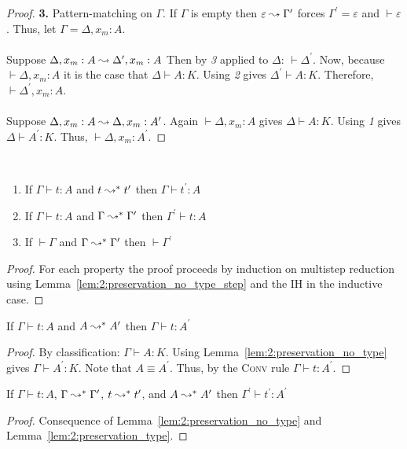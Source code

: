 \begin{proof}
    \noindent \textbf{3.} Pattern-matching on $\Gamma$.
    If $\Gamma$ is empty then $\varepsilon \leadsto \Gamma^\prime$ forces $\Gamma^\prime = \varepsilon$ and $\vdash \varepsilon$.
    Thus, let $\Gamma = \Delta, x_m : A$.
    \\ \\
    Suppose $\Delta, x_m : A \leadsto \Delta^\prime, x_m : A$
    Then by \textit{3} applied to $\Delta$: $\vdash \Delta^\prime$.
    Now, because $\vdash \Delta, x_m : A$ it is the case that $\Delta \vdash A : K$.
    Using \textit{2} gives $\Delta^\prime \vdash A : K$.
    Therefore, $\vdash \Delta^\prime, x_m : A$.
    \\ \\
    Suppose $\Delta, x_m : A \leadsto \Delta, x_m : A^\prime$.
    Again $\vdash \Delta, x_m : A$ gives $\Delta \vdash A : K$.
    Using \textit{1} gives $\Delta \vdash A^\prime : K$.
    Thus, $\vdash \Delta, x_m : A^\prime$.
\end{proof}

\begin{lemma}
    \textcolor{white}{\_}
    \begin{enumerate}
        \item If $\Gamma \vdash t : A$ and $t \leadsto^* t^\prime$ then $\Gamma \vdash t^\prime : A$
        \item If $\Gamma \vdash t : A$ and $\Gamma \leadsto^* \Gamma^\prime$ then $\Gamma^\prime \vdash t : A$
        \item If $\vdash \Gamma$ and $\Gamma \leadsto^* \Gamma^\prime$ then $\vdash \Gamma^\prime$
    \end{enumerate}
    \label{lem:2:preservation_no_type}
\end{lemma}
\begin{proof}
    For each property the proof proceeds by induction on multistep reduction using Lemma~\ref{lem:2:preservation_no_type_step} and the IH in the inductive case.
\end{proof}

\begin{lemma}
    If $\Gamma \vdash t : A$ and $A \leadsto^* A^\prime$ then $\Gamma \vdash t : A^\prime$
    \label{lem:2:preservation_type}
\end{lemma}
\begin{proof}
    By classification: $\Gamma \vdash A : K$.
    Using Lemma~\ref{lem:2:preservation_no_type} gives $\Gamma \vdash A^\prime : K$.
    Note that $A \equiv A^\prime$.
    Thus, by the \textsc{Conv} rule $\Gamma \vdash t : A^\prime$.
\end{proof}

\begin{theorem}[Preservation]
    If $\Gamma \vdash t : A$, $\Gamma \leadsto^* \Gamma^\prime$, $t \leadsto^* t^\prime$, and $A \leadsto^* A^\prime$ then $\Gamma^\prime \vdash t^\prime : A^\prime$
    \label{lem:2:preservation}
\end{theorem}
\begin{proof}
    Consequence of Lemma~\ref{lem:2:preservation_no_type} and Lemma~\ref{lem:2:preservation_type}.
\end{proof}
